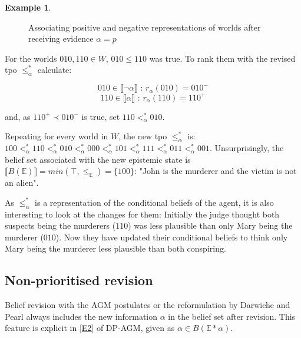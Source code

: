 \documentclass[english, 12pt]{scrartcl}
\theoremstyle{definition}
\newtheorem{example}{Example}
\theoremstyle{definition}
\theoremstyle{definition}
\newcommand{\modelsOf}[1]{\llbracket #1 \rrbracket}
\begin{document}
\begin{example}
\begin{figure}[H]
            \caption{Associating positive and negative representations of worlds after receiving evidence $\alpha=p$}
            \label{fig:example-tpo-revised}
    \end{figure}
    
    For the worlds $010, 110 \in W$, $010 \leq 110$ was true. To rank them with the revised tpo $\leq_{\alpha}^{\ast}$ calculate:
    
    \begin{equation*}
        010 \in \modelsOf{\neg\alpha} \textrm{ : } r_{\alpha}(010) = 010^{-}
    \end{equation*}
    \begin{equation*}
        110 \in \modelsOf{\alpha} \textrm{ : } r_{\alpha}(110) = 110^{+}
    \end{equation*}
    
    and, as $110^{+} \prec 010^{-}$ is true, set $110 <_{\alpha}^{\ast} 010$.
    
    Repeating for every world in $W$, the new tpo $\leq_{\alpha}^{\ast}$ is: $100 <_{\alpha}^{\ast} 110 <_{\alpha}^{\ast} 010 <_{\alpha}^{\ast} 000 <_{\alpha}^{\ast} 101 <_{\alpha}^{\ast} 111 <_{\alpha}^{\ast} 011 <_{\alpha}^{\ast} 001$. Unsurprisingly, the belief set associated with the new epistemic state is $\modelsOf{B(\mathbb{E})} = min(\top, \leq_{\mathbb{E}}) = \{100\}$: "John is the murderer and the victim is not an alien".
    
    As $\leq_{\alpha}^{\ast}$ is a representation of the conditional beliefs of the agent, it is also interesting to look at the changes for them: Initially the judge thought both suspects being the murderers ($110$) was less plausible than only Mary being the murderer ($010$). Now they have updated their conditional beliefs to think only Mary being the murderer less plausible than both conspiring.
\end{example}

\subsection{Non-prioritised revision}
\label{section:non-prioritised-revision}

Belief revision with the AGM postulates \cite{Alchourron1985} or the reformulation by Darwiche and Pearl \cite{Darwiche1997} always includes the new information $\alpha$ in the belief set after revision. This feature is explicit in \ref{E2} of DP-AGM, given as $\alpha \in B(\mathbb{E}\ast\alpha)$.
\end{document}
